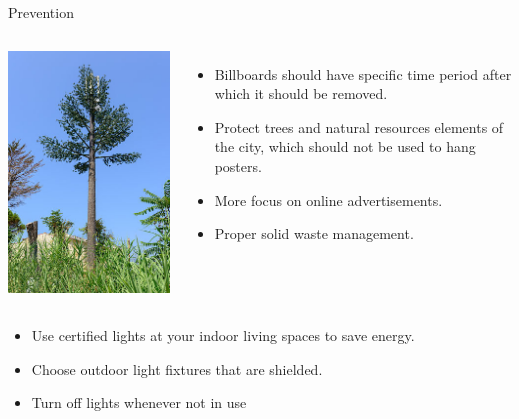 \documentclass{beamer}
\begin{document}
     \begin{frame}{Prevention}
        \begin{columns}
                \includegraphics[height=.99\textwidth,width=.99\textwidth]{img/vp-wiki-arttree.jpg}
                \begin{itemize}
                    \item Billboards should have specific time period after which it should be removed.
                    \item Protect trees and natural resources elements of the city, which should not be used to hang posters.
                    \item More focus on online advertisements. 
                    \item Proper solid waste management.
                \end{itemize}
        \end{columns}
     \end{frame}
     \begin{frame}
        \begin{itemize}
         \item Use certified lights at your indoor living spaces to save energy.
         \item Choose outdoor light fixtures that are shielded.
         \item Turn off lights whenever not in use
         \end{itemize}
     \end{frame}
\end{document}
